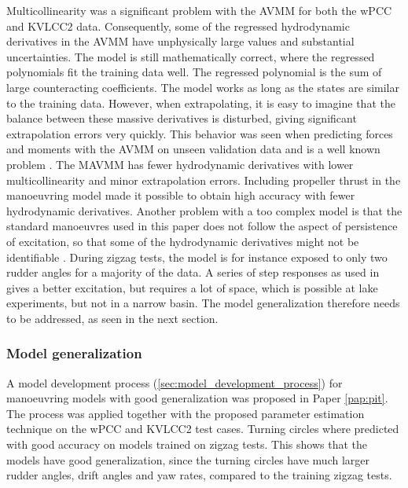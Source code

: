 Multicollinearity was a significant problem with the AVMM for both the wPCC and KVLCC2 data. Consequently, some of the regressed hydrodynamic derivatives in the AVMM have unphysically large values and substantial uncertainties. The model is still mathematically correct, where the regressed polynomials fit the training data well. The regressed polynomial is the sum of large counteracting coefficients. The model works as long as the states are similar to the training data. However, when extrapolating, it is easy to imagine that the balance between these massive derivatives is disturbed, giving significant extrapolation errors very quickly. This behavior was seen when predicting forces and moments with the AVMM on unseen validation data and is a well known problem \cite{ittc_maneuvering_2008}.
The MAVMM has fewer hydrodynamic derivatives with lower multicollinearity and minor extrapolation errors. Including propeller thrust in the manoeuvring model made it possible to obtain high accuracy with fewer hydrodynamic derivatives. Another problem with a too complex model is that the standard manoeuvres used in this paper does not follow the aspect of persistence of excitation, so that some of the hydrodynamic derivatives might not be identifiable \cite{revestido_herrero_two-step_2012}. During zigzag tests, the model is for instance exposed to only two rudder angles for a majority of the data. A series of step responses as used in \cite{miller_ship_2021} gives a better excitation, but requires a lot of space, which is possible at lake experiments, but not in a narrow basin. The model generalization therefore needs to be addressed, as seen in the next section.

\subsubsection*{Model generalization} 
A model development process (\autoref{sec:model_development_process}) for manoeuvring models with good generalization was proposed in Paper \ref{pap:pit}.
The process was applied together with the proposed parameter estimation technique on the wPCC and KVLCC2 test cases. Turning circles where predicted with good accuracy on models trained on zigzag tests. This shows that the models have good generalization, since the turning circles have much larger rudder angles, drift angles and yaw rates, compared to the training zigzag tests. 

